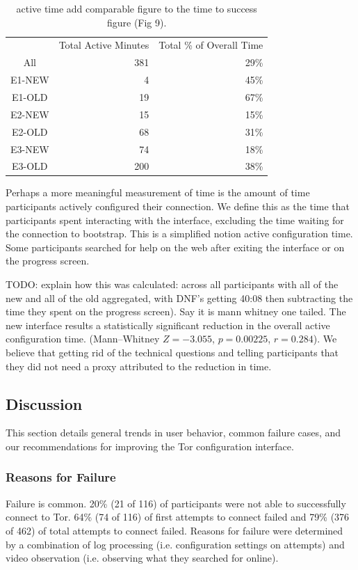 \documentclass[USenglish,oneside,twocolumn]{article}
\begin{document}
\begin{table}
\centering
	\begin{tabular}{c r r}
	 & Total Active Minutes & Total \% of Overall Time \\
	\noalign{\hrule}
	All & 381 & 29\% \\ 
	E1-NEW & 4 & 45\% \\
	E1-OLD & 19 & 67\% \\
	E2-NEW & 15 & 15\% \\
	E2-OLD & 68 & 31\% \\
	E3-NEW & 74 & 18\% \\
	E3-OLD & 200 & 38\% \\
	\end{tabular}
\caption{active time {\color {red} add comparable figure to the time to success figure (Fig 9)}.} 
\label{table:active_time}
\end{table}

Perhaps a more meaningful measurement of time is the amount of time participants actively configured their connection. We define this as the time that participants spent interacting with the interface, excluding the time waiting for the connection to bootstrap. This is a simplified notion active configuration time. Some participants searched for help on the web after exiting the interface or on the progress screen. 

{\color {red} TODO: explain how this was calculated: across all participants with all of the new and all of the old aggregated, with DNF's getting 40:08 then subtracting the time they spent on the progress screen). Say it is mann whitney one tailed. } The new interface results a statistically significant reduction in the overall active configuration time. (Mann--Whitney $Z = -3.055$, $p = 0.00225$, $r= 0.284$). We believe that getting rid of the technical questions and telling participants that they did not need a proxy attributed to the reduction in time. 

\subsection{Discussion} 
This section details general trends in user behavior, common failure cases, and our recommendations for 
improving the Tor configuration interface. 

\subsubsection{Reasons for Failure} 
Failure is common. 20\% (21 of 116) of participants were not able to successfully connect to Tor. 64\% (74 of 116) of first attempts to connect failed and 79\% (376 of 462) of total attempts to connect failed. Reasons for failure were determined by a combination of log processing (i.e. configuration settings on attempts) and video observation (i.e. observing what they searched for online). \\ 
\end{document}
